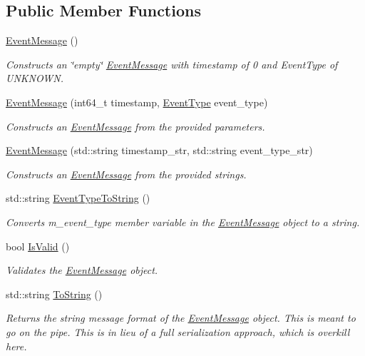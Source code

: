 \subsection*{Public Member Functions}
\begin{DoxyCompactItemize}
\item 
\mbox{\label{classEventMessage_a1af65b34ed2337c476357d1e8c666308}} 
\mbox{\hyperlink{classEventMessage_a1af65b34ed2337c476357d1e8c666308}{Event\+Message}} ()
\begin{DoxyCompactList}\small\item\em Constructs an \char`\"{}empty\char`\"{} \mbox{\hyperlink{classEventMessage}{Event\+Message}} with timestamp of 0 and Event\+Type of U\+N\+K\+N\+O\+WN. \end{DoxyCompactList}\item 
\mbox{\hyperlink{classEventMessage_a2cf6e1e690c71c4151ba87102b15c86b}{Event\+Message}} (int64\+\_\+t timestamp, \mbox{\hyperlink{classEventMessage_a262da559aa416f176fdda72e8b5113ab}{Event\+Type}} event\+\_\+type)
\begin{DoxyCompactList}\small\item\em Constructs an \mbox{\hyperlink{classEventMessage}{Event\+Message}} from the provided parameters. \end{DoxyCompactList}\item 
\mbox{\hyperlink{classEventMessage_ae9314c9140aec416b1e403c2ec3dad25}{Event\+Message}} (std\+::string timestamp\+\_\+str, std\+::string event\+\_\+type\+\_\+str)
\begin{DoxyCompactList}\small\item\em Constructs an \mbox{\hyperlink{classEventMessage}{Event\+Message}} from the provided strings. \end{DoxyCompactList}\item 
std\+::string \mbox{\hyperlink{classEventMessage_a3dd4a7325fcc39e7cfdf2365422ae1c7}{Event\+Type\+To\+String}} ()
\begin{DoxyCompactList}\small\item\em Converts m\+\_\+event\+\_\+type member variable in the \mbox{\hyperlink{classEventMessage}{Event\+Message}} object to a string. \end{DoxyCompactList}\item 
bool \mbox{\hyperlink{classEventMessage_aa5356a869ca843577b6af64f5c1c9297}{Is\+Valid}} ()
\begin{DoxyCompactList}\small\item\em Validates the \mbox{\hyperlink{classEventMessage}{Event\+Message}} object. \end{DoxyCompactList}\item 
std\+::string \mbox{\hyperlink{classEventMessage_ae13342857432d5274f4d86ecc87cb613}{To\+String}} ()
\begin{DoxyCompactList}\small\item\em Returns the string message format of the \mbox{\hyperlink{classEventMessage}{Event\+Message}} object. This is meant to go on the pipe. This is in lieu of a full serialization approach, which is overkill here. \end{DoxyCompactList}\end{DoxyCompactItemize}

